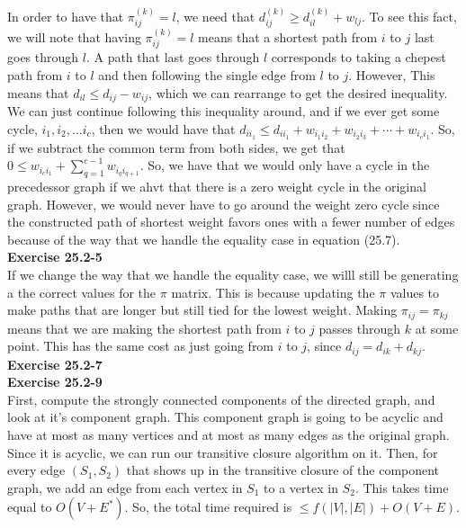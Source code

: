 \documentclass{article}
\begin{document}
In order to have that $\pi_{ij}^{(k)} = l$, we need that $d_{ij}^{(k)} \ge d_{il}^{(k)} + w_{lj}$. To see this fact, we will note that having $\pi_{ij}^{(k)} = l$ means that a shortest path from $i$ to $j$ last goes through $l$. A path that last goes through $l$ corresponds to taking a chepest path from $i$ to $l$ and then following the single edge from $l$ to $j$. However, This means that $d_{il} \le d_{ij} - w_{ij}$, which we can rearrange to get the desired inequality. We can just continue following this inequality around, and if we ever get some cycle, $i_1,i_2,\ldots i_c$, then we would have that $d_{i i_1} \le d_{i i_1} + w_{i_1 i_2} + w_{i_2 i_3} + \cdots + w_{i_c i_1}$. So, if we subtract the common term from both sides, we get that $0 \le w_{i_c i_1}+ \sum_{q =1}^{c-1} w_{i_q i_{q+1}}$. So, we have that we would only have a cycle in the precedessor graph if we ahvt that there is a zero weight cycle in the original graph. However, we would never have to go around the weight zero cycle since the constructed path of shortest weight favors ones with a fewer number of edges because of the way that we handle the equality case in equation (25.7).\\


\noindent\textbf{Exercise 25.2-5}\\
If we change the way that we handle the equality case, we willl still be generating a the correct values for the $\pi$ matrix. This is because updating the $\pi$ values to make paths that are longer but still tied for the lowest weight. Making $\pi_{ij} = \pi_{kj}$ means that we are making the shortest path from $i$ to $j$ passes through $k$ at some point. This has the same cost as just going from $i$ to $j$, since $d_{ij} = d_{ik}+d_{kj}$.\\


\noindent\textbf{Exercise 25.2-7}\\


\noindent\textbf{Exercise 25.2-9}\\
First, compute the strongly connected components of the directed graph, and look at it's component graph. This component graph is going to be acyclic and have at most as many vertices and at most as many edges as the original graph. Since it is acyclic, we can run our transitive closure algorithm on it. Then, for every edge $(S_1,S_2)$ that shows up in the transitive closure of the component graph, we add an edge from each vertex in $S_1$ to a vertex in $S_2$. This takes time equal to $O(V+E^*)$. So, the total time required is $\le f(|V|,|E|) + O(V+E)$.\\
\end{document}
